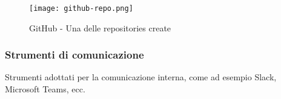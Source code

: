 \begin{figure}[H]
    \label{fig:github}
    \caption{GitHub - Una delle repositories create} 
    \centering
    \texttt{[image: github-repo.png]}
\end{figure}

\pagebreak
\subsubsection{Strumenti di comunicazione}
\label{sez:strumenti-comunicazione}

Strumenti adottati per la comunicazione interna, come ad esempio Slack, Microsoft Teams, ecc.